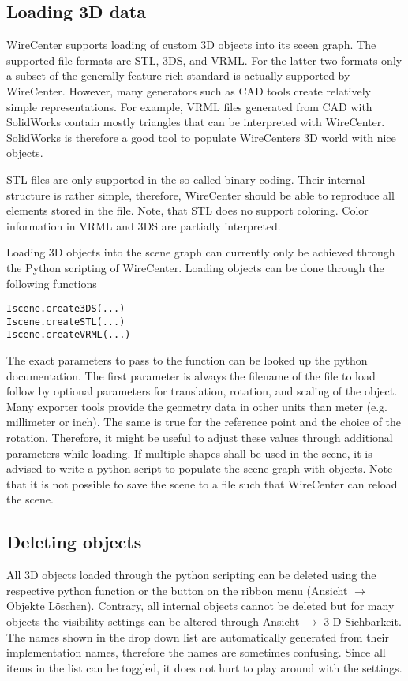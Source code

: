 \documentclass[11pt,a4paper,onepage,openany]{book}
\begin{document}
\subsection{Loading 3D data}
WireCenter supports loading of custom 3D objects into its sceen graph. The
supported file formats are STL, 3DS, and VRML. For the latter two formats
only
a subset of the generally feature rich standard is actually supported by
WireCenter. However, many generators such as CAD tools create relatively
simple
representations. For example, VRML files generated from CAD with SolidWorks
contain mostly triangles that can be interpreted with WireCenter. SolidWorks
is
therefore a good tool to populate WireCenters 3D world with nice objects.

STL files are only supported in the so-called binary coding. Their internal
structure is rather simple, therefore, WireCenter should be able to reproduce
all elements stored in the file. Note, that STL does no support coloring.
Color information in VRML and 3DS are partially interpreted.

Loading 3D objects into the scene graph can currently only be achieved
through the Python scripting of WireCenter. Loading objects can be done
through the following functions
\begin{verbatim}
Iscene.create3DS(...)
Iscene.createSTL(...)
Iscene.createVRML(...)
\end{verbatim}
The exact parameters to pass to the function can be looked up the python
documentation. The first parameter is always the filename of the file to load
follow by optional parameters for translation, rotation, and scaling of the
object. Many exporter tools provide the geometry data in other units than
meter (e.g. millimeter or inch). The same is true for the reference point and
the choice of the rotation. Therefore, it might be useful to adjust these
values through additional parameters while loading. If multiple shapes shall
be used in the scene, it is advised to write a python script to populate the
scene graph with objects. Note that it is not possible to save the scene to a
file such that WireCenter can reload the scene.

\subsection{Deleting objects}
All 3D objects loaded through the python scripting can be deleted using the
respective python function or the button on the ribbon menu (Ansicht
$\rightarrow$ Objekte L\"oschen). Contrary, all internal objects cannot be
deleted but for many objects the visibility settings can be altered through
Ansicht $\rightarrow$ 3-D-Sichbarkeit. The names shown in the drop down list
are automatically generated from their implementation names, therefore the
names are sometimes confusing. Since all items in the list can be toggled, it
does not hurt to play around with the settings.
\end{document}
